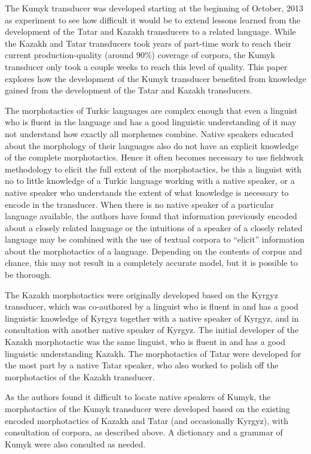 \documentclass[a4paper,11pt,twocolumn]{article}
\begin{document}
The Kumyk transducer was developed starting at the beginning of October, 2013 as experiment to see how difficult it would be to extend lessons learned from the development of the Tatar and Kazakh transducers to a related language.  While the Kazakh and Tatar transducers took years of part-time work to reach their current production-quality (around 90\%) coverage of corpora, the Kumyk transducer only took a couple weeks to reach this level of quality.  This paper explores how the development of the Kumyk transducer benefited from knowledge gained from the development of the Tatar and Kazakh transducers.

The morphotactics of Turkic languages are complex enough that even a linguist who is fluent in the language and has a good linguistic understanding of it may not understand how exactly all morphemes combine.  Native speakers educated about the morphology of their languages also do not have an explicit knowledge of the complete morphotactics.  Hence it often becomes necessary to use fieldwork methodology to elicit the full extent of the morphotactics, be this a linguist with no to little knowledge of a Turkic language working with a native speaker, or a native speaker who understands the extent of what knowledge is necessary to encode in the transducer.  When there is no native speaker of a particular language available, the authors have found that information previously encoded about a closely related language or the intuitions of a speaker of a closely related language may be combined with the use of textual corpora to ``elicit'' information about the morphotactics of a language.  Depending on the contents of corpus and chance, this may not result in a completely accurate model, but it is possible to be thorough.

The Kazakh morphotactics were originally developed based on the Kyrgyz transducer, which was co-authored by a linguist who is fluent in and has a good linguistic knowledge of Kyrgyz together with a native speaker of Kyrgyz, and in consultation with another native speaker of Kyrgyz.  The initial developer of the Kazakh morphotactic was the same linguist, who is fluent in and has a good linguistic understanding Kazakh.  The morphotactics of Tatar were developed for the most part by a native Tatar speaker, who also worked to polish off the morphotactics of the Kazakh transducer.

As the authors found it difficult to locate native speakers of Kumyk, the morphotactics of the Kumyk transducer were developed based on the existing encoded morphotactics of Kazakh and Tatar (and occasionally Kyrgyz), with consultation of corpora, as described above.  A dictionary \citep{bammatov1960} and a grammar \citep{olmesov2000} of Kumyk were also consulted as needed.
\end{document}
